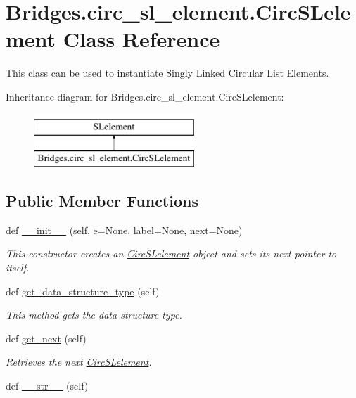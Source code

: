 \hypertarget{class_bridges_1_1circ__sl__element_1_1_circ_s_lelement}{}\section{Bridges.\+circ\+\_\+sl\+\_\+element.\+Circ\+S\+Lelement Class Reference}
\label{class_bridges_1_1circ__sl__element_1_1_circ_s_lelement}


This class can be used to instantiate Singly Linked Circular List Elements.  


Inheritance diagram for Bridges.\+circ\+\_\+sl\+\_\+element.\+Circ\+S\+Lelement\+:\begin{figure}[H]
\begin{center}
\leavevmode
\includegraphics[height=2.000000cm]{class_bridges_1_1circ__sl__element_1_1_circ_s_lelement}
\end{center}
\end{figure}
\subsection*{Public Member Functions}
\begin{DoxyCompactItemize}
\item 
def \mbox{\hyperlink{class_bridges_1_1circ__sl__element_1_1_circ_s_lelement_a36a23cc30ce7dc037db8a8734adb37da}{\+\_\+\+\_\+init\+\_\+\+\_\+}} (self, e=None, label=None, next=None)
\begin{DoxyCompactList}\small\item\em This constructor creates an \mbox{\hyperlink{class_bridges_1_1circ__sl__element_1_1_circ_s_lelement}{Circ\+S\+Lelement}} object and sets its next pointer to itself. \end{DoxyCompactList}\item 
def \mbox{\hyperlink{class_bridges_1_1circ__sl__element_1_1_circ_s_lelement_a53774e23afd83780f1a8a64a68892494}{get\+\_\+data\+\_\+structure\+\_\+type}} (self)
\begin{DoxyCompactList}\small\item\em This method gets the data structure type. \end{DoxyCompactList}\item 
def \mbox{\hyperlink{class_bridges_1_1circ__sl__element_1_1_circ_s_lelement_a709b68b1e016734f15c64bde94077d58}{get\+\_\+next}} (self)
\begin{DoxyCompactList}\small\item\em Retrieves the next \mbox{\hyperlink{class_bridges_1_1circ__sl__element_1_1_circ_s_lelement}{Circ\+S\+Lelement}}. \end{DoxyCompactList}\item 
def \mbox{\hyperlink{class_bridges_1_1circ__sl__element_1_1_circ_s_lelement_ab19b10a71d5f93996eb15c19cfaf2688}{\+\_\+\+\_\+str\+\_\+\+\_\+}} (self)
\end{DoxyCompactItemize}


